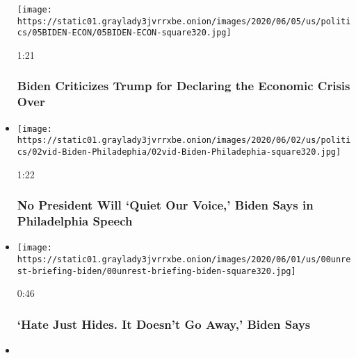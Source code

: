 \begin{itemize}
  \texttt{[image: https://static01.graylady3jvrrxbe.onion/images/2020/06/05/us/politics/05BIDEN-ECON/05BIDEN-ECON-square320.jpg]}

  1:21

  \hypertarget{biden-criticizes-trump-for-declaring-the-economic-crisis-over}{%
  \subsubsection{Biden Criticizes Trump for Declaring the Economic
  Crisis
  Over}\label{biden-criticizes-trump-for-declaring-the-economic-crisis-over}}
\item
  \href{https://www.nytimes3xbfgragh.onion/video/us/elections/100000007169461/watch-live-biden-visits-philadelphia.html?action=click\&module=video-series-bar\&region=header\&pgtype=Article\&playlistId=video/2020-Elections}{}

  \texttt{[image: https://static01.graylady3jvrrxbe.onion/images/2020/06/02/us/politics/02vid-Biden-Philadephia/02vid-Biden-Philadephia-square320.jpg]}

  1:22

  \hypertarget{no-president-will-quiet-our-voice-biden-says-in-philadelphia-speech}{%
  \subsubsection{No President Will `Quiet Our Voice,' Biden Says in
  Philadelphia
  Speech}\label{no-president-will-quiet-our-voice-biden-says-in-philadelphia-speech}}
\item
  \href{https://www.nytimes3xbfgragh.onion/video/us/elections/100000007168118/hate-just-hides-it-doesnt-go-away-biden-says.html?action=click\&module=video-series-bar\&region=header\&pgtype=Article\&playlistId=video/2020-Elections}{}

  \texttt{[image: https://static01.graylady3jvrrxbe.onion/images/2020/06/01/us/00unrest-briefing-biden/00unrest-briefing-biden-square320.jpg]}

  0:46

  \hypertarget{hate-just-hides-it-doesnt-go-away-biden-says}{%
  \subsubsection{`Hate Just Hides. It Doesn't Go Away,' Biden
  Says}\label{hate-just-hides-it-doesnt-go-away-biden-says}}
\item
  \href{https://www.nytimes3xbfgragh.onion/video/us/politics/100000007111258/watch-live-hillary-clinton-endorses-biden.html?action=click\&module=video-series-bar\&region=header\&pgtype=Article\&playlistId=video/2020-Elections}{}


\end{itemize}
